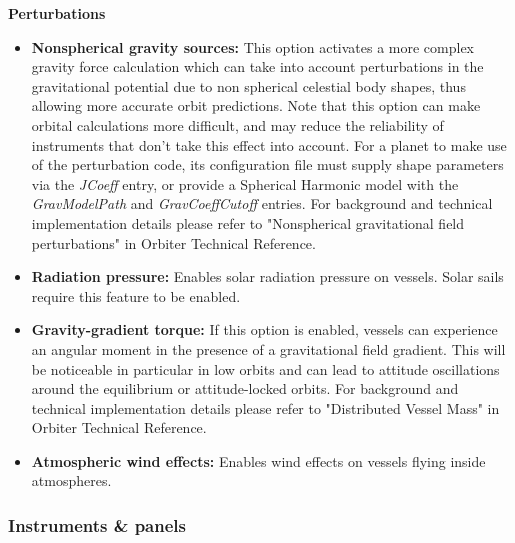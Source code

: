 \documentclass[Orbiter User Manual.tex]{subfiles}
\begin{document}
\textbf{Perturbations}
\begin{itemize}
\item \textbf{Nonspherical gravity sources:} This option activates a more complex gravity force calculation which can take into account perturbations in the gravitational potential due to non spherical celestial body shapes, thus allowing more accurate orbit predictions. Note that this option can make orbital calculations more difficult, and may reduce the reliability of instruments that don't take this effect into account. For a planet to make use of the perturbation code, its configuration file must supply shape parameters via the \textit{JCoeff} entry, or provide a Spherical Harmonic model with the \textit{GravModelPath} and \textit{GravCoeffCutoff} entries. For background and technical implementation details please refer to "Nonspherical gravitational field perturbations" in Orbiter Technical Reference.
\item \textbf{Radiation pressure:} Enables solar radiation pressure on vessels. Solar sails require this feature to be enabled.
\item \textbf{Gravity-gradient torque:} If this option is enabled, vessels can experience an angular moment in the presence of a gravitational field gradient. This will be noticeable in particular in low orbits and can lead to attitude oscillations around the equilibrium or attitude-locked orbits. For background and technical implementation details please refer to "Distributed Vessel Mass" in Orbiter Technical Reference.
\item \textbf{Atmospheric wind effects:} Enables wind effects on vessels flying inside atmospheres.
\end{itemize}

\subsubsection{Instruments \& panels}
\label{sssec:launchpad_instr_panels}
\begin{figure}[H]
	\centering
\end{figure}
\end{document}
